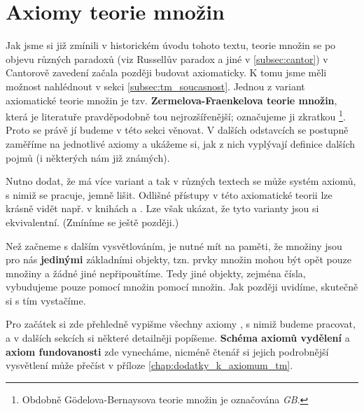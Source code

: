 \chapter{Axiomy teorie množin}\label{chap:axiomy_tm}
Jak jsme si již zmínili v historickém úvodu tohoto textu, teorie množin se po objevu různých paradoxů (viz Russellův paradox a jiné v \ref{subsec:cantor}) v Cantorově zavedení začala později budovat axiomaticky. K tomu jsme měli možnost nahlédnout v sekci \ref{subsec:tm_soucasnost}. Jednou z variant axiomatické teorie množin je tzv. \textbf{Zermelova-Fraenkelova teorie množin}, která je literatuře pravděpodobně tou nejrozšířenější; označujeme ji zkratkou \emph{\ZF{}}\footnote{Obdobně Gödelova-Bernaysova teorie množin je označována \emph{\textsf{GB}}.}. Proto se právě jí budeme v této sekci věnovat. V dalších odstavcích se postupně zaměříme na jednotlivé axiomy \ZF{} a ukážeme si, jak z nich vyplývají definice dalších pojmů (i některých nám již známých).\par
Nutno dodat, že \ZF{} má více variant a tak v různých textech se může systém axiomů, s nimiž se pracuje, jemně lišit. Odlišné přístupy v této axiomatické teorii lze krásně vidět např. v knihách \cite{BalcarStepanek1986} a \cite{Goldrei2017}. Lze však ukázat, že tyto varianty jsou si ekvivalentní. (Zmíníme se ještě později.)\par
Než začneme s dalším vysvětlováním, je nutné mít na paměti, že množiny jsou pro nás \textbf{jedinými} základními objekty, tzn. prvky množin mohou být opět pouze množiny a žádné jiné nepřipouštíme. Tedy jiné objekty, zejména čísla, vybudujeme pouze pomocí množin pomocí množin. Jak později uvidíme, skutečně si s tím vystačíme.\par
Pro začátek si zde přehledně vypišme všechny axiomy \ZF{}, s nimiž budeme pracovat, a v dalších sekcích si některé detailněji popíšeme. \textbf{Schéma axiomů vydělení} a \textbf{axiom fundovanosti} zde vynecháme, nicméně čtenář si jejich podrobnější vysvětlení může přečíst v příloze \ref{chap:dodatky_k_axiomum_tm}.
\medskip

